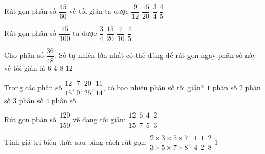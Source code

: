 \begin{ex} %
Rút gọn phân số $\dfrac{45}{60}$ về tối giản ta được
\choice
{$\dfrac{9}{12}$}
{$\dfrac{15}{20}$}
{\True $\dfrac{3}{4}$}
{$\dfrac{4}{5}$}
\end{ex}

\begin{ex} %
Rút gọn phân số $\dfrac{75}{100}$ ta được
\choice
{\True $\dfrac{3}{4}$}
{$\dfrac{15}{20}$}
{$\dfrac{7}{10}$}
{$\dfrac{4}{5}$}
\end{ex}

\begin{ex} %
Cho phân số $\dfrac{36}{48}$. Số tự nhiên lớn nhất có thể dùng để rút gọn ngay phân số này về tối giản là
\choice
{$6$}
{$4$}
{$8$}
{\True $12$}
\end{ex}

\begin{ex} %
Trong các phân số $\dfrac{12}{15}, \dfrac{7}{9}, \dfrac{20}{25}, \dfrac{11}{14}$, có bao nhiêu phân số tối giản?
\choice
{$1$ phân số}
{\True $2$ phân số}
{$3$ phân số}
{$4$ phân số}
\end{ex}

\begin{ex} %
Rút gọn phân số $\dfrac{120}{150}$ về dạng tối giản:
\choice
{$\dfrac{12}{15}$}
{$\dfrac{6}{7}$}
{\True $\dfrac{4}{5}$}
{$\dfrac{2}{3}$}
\end{ex}

\begin{ex} %
Tính giá trị biểu thức sau bằng cách rút gọn: $\dfrac{2 \times 3 \times 5 \times 7}{3 \times 5 \times 7 \times 8}$.
\choice
{\True $\dfrac{1}{4}$}
{$\dfrac{1}{2}$}
{$\dfrac{2}{8}$}
{$1$}
\end{ex}

